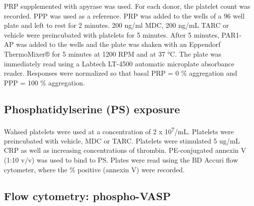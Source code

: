 \documentclass[11pt,twoside]{bristolthesis}
\begin{document}
PRP supplemented with apyrase was used. For each donor, the platelet count was recorded. PPP was used as a reference. PRP was added to the wells of a 96 well plate and left to rest for 2 minutes. 200 ng/ml MDC, 200 ng/mL TARC or vehicle were preincubated with platelets for 5 minutes. After 5 minutes, PAR1-AP was added to the wells and the plate was shaken with an Eppendorf ThermoMixer® for 5 minutes at 1200 RPM and at 37 °C. The plate was immediately read using a Labtech LT-4500 automatic microplate absorbance reader. Responses were normalized so that basal PRP = 0 \% aggregation and PPP = 100 \% aggregation.

\hypertarget{phosphatidylserine-ps-exposure}{%
\subsection{Phosphatidylserine (PS) exposure}\label{phosphatidylserine-ps-exposure}}

Wahsed platelets were used at a concentration of 2 x 10\textsuperscript{7}/mL. Platelets were preincubated with vehicle, MDC or TARC. Platelets were stimulated 5 ug/mL CRP as well as increasing concentrations of thrombin. PE-conjugated annexin V (1:10 v/v) was used to bind to PS. Plates were read using the BD Accuri flow cytometer, where the \% positive (annexin V) were recorded.

\hypertarget{flow-cytometry-phospho-vasp}{%
\subsection{Flow cytometry: phospho-VASP}\label{flow-cytometry-phospho-vasp}}
\end{document}
